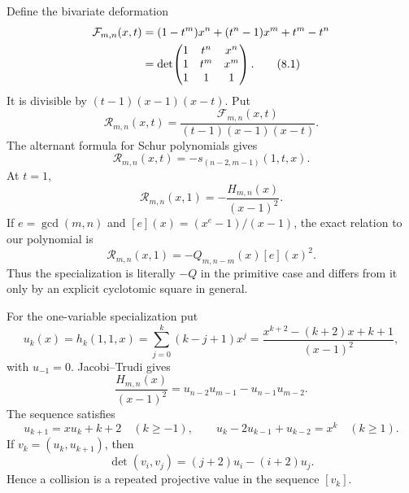 \documentclass[11pt]{article}
\theoremstyle{definition}
\begin{document}
Define the bivariate deformation
\begin{align}
 \mathcal F_{m,n}(x,t)
 &=(1-t^m)x^n+(t^n-1)x^m+t^m-t^n  \notag\\
 &=\det\!\begin{pmatrix}
 1&t^n&x^n\\
 1&t^m&x^m\\
 1&1&1
 \end{pmatrix}.
 \tag{8.1}
\end{align}
It is divisible by \((t-1)(x-1)(x-t)\).  Put
\[
 \mathcal R_{m,n}(x,t)=
 \frac{\mathcal F_{m,n}(x,t)}{(t-1)(x-1)(x-t)}.
\]
The alternant formula for Schur polynomials gives
\begin{equation}
 \mathcal R_{m,n}(x,t)
 =-s_{(n-2,m-1)}(1,t,x).
 \tag{8.2}
\end{equation}
At \(t=1\),
\begin{equation}
 \mathcal R_{m,n}(x,1)
 =-\frac{H_{m,n}(x)}{(x-1)^2}.
 \tag{8.3}
\end{equation}
If \(e=\gcd(m,n)\) and \([e](x)=(x^e-1)/(x-1)\), the exact relation to our
polynomial is
\begin{equation}
 \mathcal R_{m,n}(x,1)
 =-Q_{m,n-m}(x)[e](x)^2.
 \tag{8.4}
\end{equation}
Thus the specialization is literally \(-Q\) in the primitive case and differs
from it only by an explicit cyclotomic square in general.

For the one-variable specialization put
\begin{equation}
 u_k(x)=h_k(1,1,x)
 =\sum_{j=0}^k(k-j+1)x^j
 =\frac{x^{k+2}-(k+2)x+k+1}{(x-1)^2},
 \tag{8.5}
\end{equation}
with \(u_{-1}=0\).  Jacobi--Trudi gives
\begin{equation}
 \frac{H_{m,n}(x)}{(x-1)^2}
 =u_{n-2}u_{m-1}-u_{n-1}u_{m-2}.
 \tag{8.6}
\end{equation}
The sequence satisfies
\begin{equation}
 u_{k+1}=xu_k+k+2\quad(k\geq-1),
 \qquad
 u_k-2u_{k-1}+u_{k-2}=x^k\quad(k\geq1).
 \tag{8.7}
\end{equation}
If \(v_k=(u_k,u_{k+1})\), then
\begin{equation}
 \det(v_i,v_j)=(j+2)u_i-(i+2)u_j.
 \tag{8.8}
\end{equation}
Hence a collision is a repeated projective value in the sequence \([v_k]\).
\end{document}
